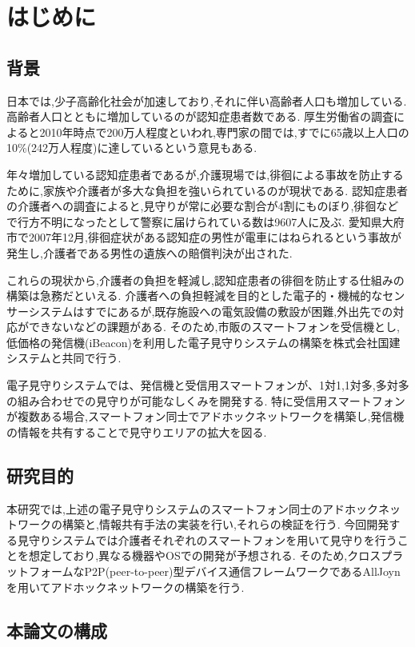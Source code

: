 \chapter{はじめに}
\label{chap:introduction}

\section{背景}
日本では,少子高齢化社会が加速しており,それに伴い高齢者人口も増加している.高齢者人口とともに増加しているのが認知症患者数である.
厚生労働省の調査\cite{厚生労働省}によると2010年時点で200万人程度といわれ,専門家の間では,すでに65歳以上人口の10\%(242万人程度)に達しているという意見もある.

年々増加している認知症患者であるが,介護現場では,徘徊による事故を防止するために,家族や介護者が多大な負担を強いられているのが現状である.
認知症患者の介護者への調査\cite{山梨県}によると,見守りが常に必要な割合が4割にものぼり,徘徊などで行方不明になったとして警察に届けられている数は9607人に及ぶ.
愛知県大府市で2007年12月,徘徊症状がある認知症の男性が電車にはねられるという事故が発生し,介護者である男性の遺族への賠償判決が出された.

これらの現状から,介護者の負担を軽減し,認知症患者の徘徊を防止する仕組みの構築は急務だといえる.
介護者への負担軽減を目的とした電子的・機械的なセンサーシステムはすでにあるが,既存施設への電気設備の敷設が困難,外出先での対応ができないなどの課題がある.
そのため,市販のスマートフォンを受信機とし,低価格の発信機(iBeacon)を利用した電子見守りシステムの構築を株式会社国建システムと共同で行う.

電子見守りシステムでは、発信機と受信用スマートフォンが、1対1,1対多,多対多の組み合わせでの見守りが可能なしくみを開発する.
特に受信用スマートフォンが複数ある場合,スマートフォン同士でアドホックネットワークを構築し,発信機の情報を共有することで見守りエリアの拡大を図る.

\section{研究目的}
本研究では,上述の電子見守りシステムのスマートフォン同士のアドホックネットワークの構築と,情報共有手法の実装を行い,それらの検証を行う.
今回開発する見守りシステムでは介護者それぞれのスマートフォンを用いて見守りを行うことを想定しており,異なる機器やOSでの開発が予想される.
そのため,クロスプラットフォームなP2P(peer-to-peer)型デバイス通信フレームワークであるAllJoynを用いてアドホックネットワークの構築を行う.

\section{本論文の構成}

